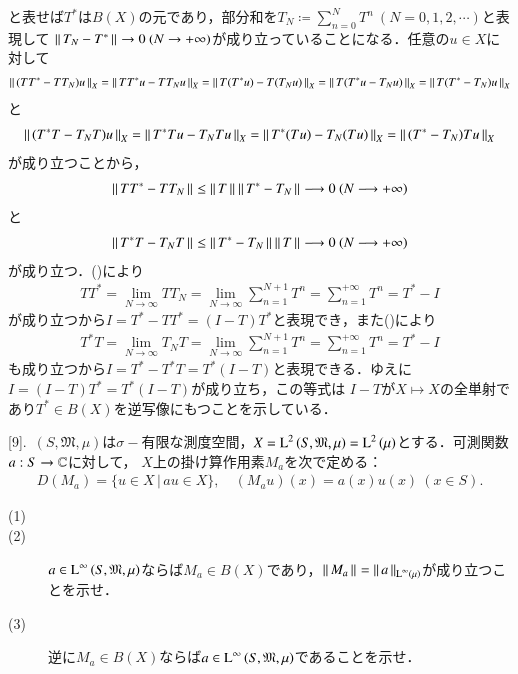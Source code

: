 \begin{prf}
\begin{description}
		と表せば$T^*$は$B(X)$の元であり，部分和を$T_N \coloneqq \sum_{n=0}^{N} T^n\ (N = 0,1,2,\cdots)$と表現して
		$\left\|\, T_N - T^*\, \right\|_{} \rightarrow 0\ (N \rightarrow +\infty)$が成り立っていることになる．任意の$u \in X$に対して
		\begin{align}
			\left\|\, (TT^* - TT_N)u\, \right\|_{X} = \left\|\, TT^*u - TT_Nu\, \right\|_{X} = \left\|\, T(T^*u) - T(T_Nu)\, \right\|_{X} = \left\|\, T(T^*u - T_Nu)\, \right\|_{X} = \left\|\, T(T^* - T_N)u\, \right\|_{X}
		\end{align}
		と
		\begin{align}
			\left\|\, (T^*T - T_NT)u\, \right\|_{X} = \left\|\, T^*Tu - T_NTu\, \right\|_{X} = \left\|\, T^*(Tu) - T_N(Tu)\, \right\|_{X} = \left\|\, (T^*-T_N)Tu\, \right\|_{X}
		\end{align}
		が成り立つことから，
		\begin{align}
			\left\|\, TT^* - TT_N\, \right\|_{} \leq \left\|\, T\, \right\|_{}\left\|\, T^* - T_N\, \right\|_{} \longrightarrow 0\ (N \longrightarrow +\infty) \label{eq:func_analy_conv1}
		\end{align}
		と
		\begin{align}
			\left\|\, T^*T - T_NT\, \right\|_{} \leq \left\|\, T^* - T_N\, \right\|_{}\left\|\, T\, \right\|_{} \longrightarrow 0\ (N \longrightarrow +\infty) \label{eq:func_analy_conv2}
		\end{align}
		が成り立つ．()により
		\begin{align}
			TT^* = \lim_{N \to \infty} TT_N = \lim_{N \to \infty} \sum_{n=1}^{N+1} T^n = \sum_{n=1}^{+\infty} T^n = T^* - I
		\end{align}
		が成り立つから$I = T^* - TT^* = (I - T)T^*$と表現でき，また()により
		\begin{align}
			T^*T = \lim_{N \to \infty} T_NT = \lim_{N \to \infty} \sum_{n=1}^{N+1} T^n = \sum_{n=1}^{+\infty} T^n = T^* - I
		\end{align}
		も成り立つから$I = T^* - T^*T = T^*(I - T)$と表現できる．ゆえに$I = (I - T)T^* = T^*(I - T)$が成り立ち，この等式は
		$I-T$が$X \longmapsto X$の全単射であり$T^* \in B(X)$を逆写像にもつことを示している．
		\QED
\end{description}
\end{prf}


[9].\ $(S, \mathfrak{M}, \mu)$は$\sigma-$有限な測度空間，$X=\operatorname{L}^{2} \left(S, \mathfrak{M}, \mu\right)=\operatorname{L}^{2} \left(\mu\right)$とする．可測関数$a:S \rightarrow \mathbb{C}$に対して，
$X$上の掛け算作用素$M_a$を次で定める：
\begin{align}
	D(M_a) = \{u \in X\, |\, au \in X\}, \quad (M_au)(x) = a(x)u(x)\ (x \in S).
\end{align}
\begin{description}
	\item[(1)]
	\item[(2)] $a \in \operatorname{L}^{\infty} \left(S, \mathfrak{M}, \mu\right)$ならば$M_a \in B(X)$であり，$\left\|\, M_a\, \right\|_{} = \left\|\, a\, \right\|_{\operatorname{L}^{\infty} \left(\mu\right)}$が成り立つことを示せ．
	\item[(3)] 逆に$M_a \in B(X)$ならば$a \in \operatorname{L}^{\infty} \left(S, \mathfrak{M}, \mu\right)$であることを示せ．
\end{description}

